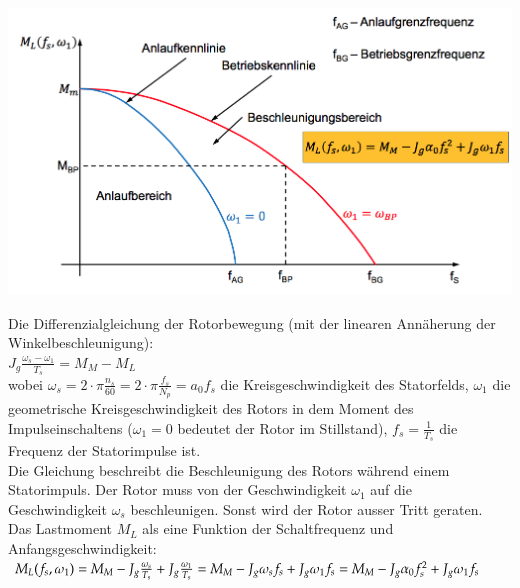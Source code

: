 \begin{minipage}{0.5 \linewidth}
\includegraphics[width = \linewidth]{./Pics/VL67/Betriebsverhalten}
\end{minipage}
\begin{minipage}{0.5 \linewidth}
Die Differenzialgleichung der Rotorbewegung (mit der linearen Annäherung der Winkelbeschleunigung): \\

$J_g \frac{\omega_s-\omega_1}{T_s} = M_M - M_L$ \\

wobei $\omega_s = 2 \cdot \pi \frac{n_s}{60} = 2 \cdot \pi \frac{f_s}{N_p} = a_0 f_s$ die Kreisgeschwindigkeit des Statorfelds, $\omega_1$ die geometrische Kreisgeschwindigkeit des Rotors in dem Moment des Impulseinschaltens ($\omega_1 = 0$ bedeutet der Rotor im Stillstand), $f_s = \frac{1}{T_s}$ die Frequenz der Statorimpulse ist. \\

Die Gleichung beschreibt die Beschleunigung des Rotors während einem Statorimpuls. Der Rotor muss von der Geschwindigkeit $\omega_1$ auf die Geschwindigkeit $\omega_s$ beschleunigen. Sonst wird der Rotor ausser Tritt geraten. \\

Das Lastmoment $M_L$ als eine Funktion der Schaltfrequenz und Anfangsgeschwindigkeit: \\

$M_L(f_s,\omega_1) = M_M-J_g\frac{\omega_s}{T_s} + J_g\frac{\omega_1}{T_s} \\
= M_M-J_g\omega_s f_s + J_g \omega_1 f_s\\
= M_M - J_g \alpha_0 f_s^2 + J_g \omega_1 f_s$\\
\end{minipage}

